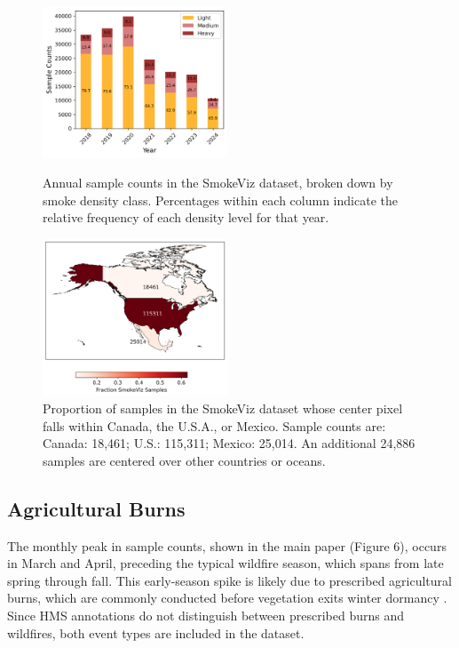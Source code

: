 \documentclass{article}
\begin{document}
\begin{figure}[!htb]
    \parbox{\textwidth}{
      \parbox{0.49\textwidth}{
        \centering
        \includegraphics[width=0.49\textwidth]{stat_figs/sample_count_per_yr_percentages.png}
        \caption{Annual sample counts in the SmokeViz dataset, broken down by smoke density class. Percentages within each column indicate the relative frequency of each density level for that year.}
        \label{count_per_yr}
      }
    \hspace{0.01\textwidth}
      \parbox{0.49\textwidth}{
        \centering
        \includegraphics[width=0.49\textwidth]{stat_figs/sample_percent_country.png}
        \caption{Proportion of samples in the SmokeViz dataset whose center pixel falls within Canada, the U.S.A., or Mexico. Sample counts are: Canada: 18,461; U.S.: 115,311; Mexico: 25,014. An additional 24,886 samples are centered over other countries or oceans.}
        \label{count_per_country}
      }
    }
\end{figure}

\subsection{Agricultural Burns}

The monthly peak in sample counts, shown in the main paper (Figure 6), occurs in March and April, preceding the typical wildfire season, which spans from late spring through fall. This early-season spike is likely due to prescribed agricultural burns, which are commonly conducted before vegetation exits winter dormancy \cite{ag_fire}. Since HMS annotations do not distinguish between prescribed burns and wildfires, both event types are included in the dataset.
\end{document}
